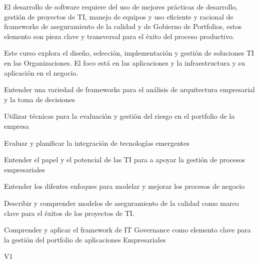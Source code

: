 \begin{syllabus}


\begin{justification}
El desarrollo de software requiere del uso de mejores prácticas de desarrollo, gestión de proyectos de TI, manejo de equipos
y uso eficiente y racional de frameworks de aseguramiento de la calidad y de Gobierno de Portfolios, estos elemento son pieza 
clave y transversal para el éxito del proceso productivo.

Este curso explora el diseño, selección, implementación y gestión de soluciones TI en las Organizaciones. El foco está en 
las aplicaciones y la infraestructura y su aplicación en el negocio.
\end{justification}

\begin{goals}
\item Entender una variedad de frameworks para el análisis de arquitectura empresarial y la toma de decisiones
\item Utilizar técnicas para la evaluación y gestión del riesgo en el portfolio de la empresa
\item Evaluar y planificar la integración de tecnologías emergentes
\item Entender el papel y el potencial de las TI para a apoyar la gestión de procesos empresariales
\item Entender los difentes enfoques para modelar y mejorar los procesos de negocio
\item Describir y comprender modelos de aseguramiento de la calidad como marco clave para el éxitos de los proyectos de TI.
\item Comprender y aplicar el framework de IT Governance como elemento clave para la gestión del portfolio de aplicaciones Empresariales
\end{goals}

\begin{outcomes}{V1}
    \item {}
    \item {}
    \item {}
    \item {}
    \item {}
    \item {}
\end{outcomes}


\end{syllabus}

